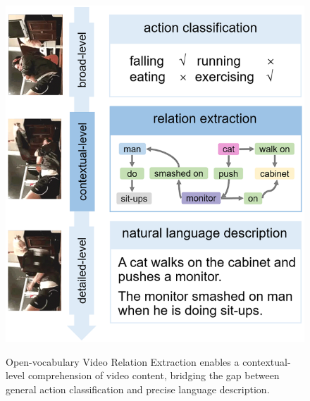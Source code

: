 \documentclass[letterpaper]{article}
\begin{document}
%

\begin{figure}[t]
  \centering
  \resizebox{0.7\linewidth}{!}
  {\includegraphics{fig/broad2detail1.png}}
  \caption{Open-vocabulary  Video Relation Extraction enables a contextual-level comprehension of video content, bridging the gap between general action classification and precise language description.}
  \label{fig:motivation}
\end{figure}
\end{document}
